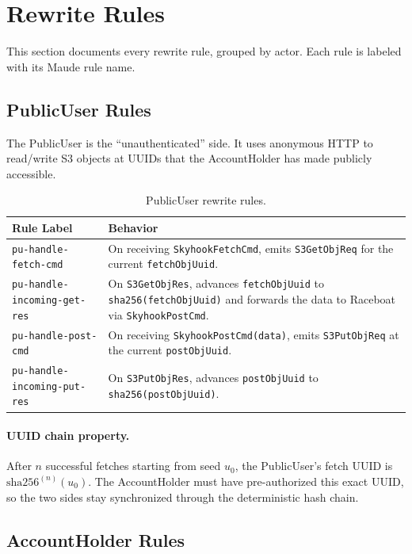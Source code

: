 \documentclass[11pt]{article}
\begin{document}
\section{Rewrite Rules}\label{sec:rules}

This section documents every rewrite rule, grouped by actor.  Each rule
is labeled with its Maude rule name.

\subsection{PublicUser Rules}

The PublicUser is the ``unauthenticated'' side.  It uses anonymous HTTP
to read/write S3 objects at UUIDs that the AccountHolder has made
publicly accessible.

\begin{table}[H]
\centering
\small
\begin{tabular}{@{}lp{8.5cm}@{}}
\toprule
\textbf{Rule Label} & \textbf{Behavior} \\
\midrule
\texttt{pu-handle-fetch-cmd}
  & On receiving \texttt{SkyhookFetchCmd}, emits \texttt{S3GetObjReq} for the current \texttt{fetchObjUuid}. \\
\texttt{pu-handle-incoming-get-res}
  & On \texttt{S3GetObjRes}, advances \texttt{fetchObjUuid} to \texttt{sha256(fetchObjUuid)} and forwards the data to Raceboat via \texttt{SkyhookPostCmd}. \\
\texttt{pu-handle-post-cmd}
  & On receiving \texttt{SkyhookPostCmd(data)}, emits \texttt{S3PutObjReq} at the current \texttt{postObjUuid}. \\
\texttt{pu-handle-incoming-put-res}
  & On \texttt{S3PutObjRes}, advances \texttt{postObjUuid} to \texttt{sha256(postObjUuid)}. \\
\bottomrule
\end{tabular}
\caption{PublicUser rewrite rules.}
\end{table}

\paragraph{UUID chain property.} After $n$ successful fetches starting
from seed $u_0$, the PublicUser's fetch UUID is
$\text{sha256}^{(n)}(u_0)$.  The AccountHolder must have pre-authorized
this exact UUID, so the two sides stay synchronized through the
deterministic hash chain.

\subsection{AccountHolder Rules}
\end{document}
